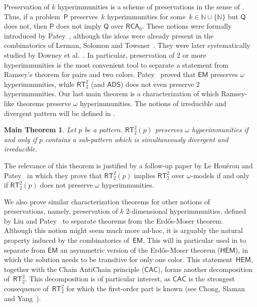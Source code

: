 \documentclass{article}
\newcommand{\Psf}{\mathsf{P}}
\newcommand{\Qsf}{\mathsf{Q}}
\newcommand{\RCA}[0]{\mathsf{RCA}}
\newcommand{\CAC}[0]{\mathsf{CAC}}
\newcommand{\ADS}[0]{\mathsf{ADS}}
\newcommand{\EM}[0]{\mathsf{EM}}
\newcommand{\RT}[0]{\mathsf{RT}}
\newcommand{\NN}[0]{\mathbb{N}}
\def\NN{\mathbb{N}}
\newcommand{\HEM}{\mathsf{HEM}}
\numberwithin{theorem}{section}
\newtheorem{maintheorem}[theorem]{Main Theorem}
\theoremstyle{definition}
\begin{document}
Preservation of $k$ hyperimmunities is a scheme of preservations in the sense of . Thus, if a problem~$\Psf$ preserves~$k$ hyperimmunities for some~$k \in \NN \cup \{\NN\}$ but $\Qsf$ does not, then $\Psf$ does not imply $\Qsf$ over $\RCA_0$. These notions were formally introduced by Patey~\cite{patey2017iterative}, although the ideas were already present in the combinatorics of Lerman, Solomon and Towsner~\cite{lerman2013separating}. They were later systematically studied by Downey et al.~\cite{downey2022relationships}. In particular, preservation of 2 or more hyperimmunities is the most convenient tool to separate a statement from Ramsey's theorem for pairs and two colors. Patey~\cite{patey2017iterative} proved that $\EM$ preserves $\omega$ hyperimmunities, while $\RT^2_2$ (and $\ADS$) does not even preserve 2 hyperimmunities. Our last main theorem is a characterization of which Ramsey-like theorems preserve $\omega$ hyperim\-munities. The notions of irreducible and divergent pattern will be defined in .

\begin{maintheorem}\label{omega-hyp-divergent-irreducible}
Let $p$ be a pattern. $\RT^2_2(p)$ preserves $\omega$ hyperimmunities if and only if $p$ contains a sub-pattern which is simultaneously divergent and irreducible.
\end{maintheorem}

The relevance of this theorem is justified by a follow-up paper by Le Houérou and Patey~\cite{houerou2025ramseylike} in which they prove that $\RT^2_2(p)$ implies $\RT^2_2$ over $\omega$-models if and only if $\RT^2_2(p)$ does not preserve $\omega$ hyperimmunities.

We also prove similar characterization theorems for other notions of preserva\-tions, namely, preservation of $k$ 2-dimensional hyperimmunities, defined by Liu and Patey~\cite{liu2022reverse} to separate theorems from the Erd\H{o}s-Moser theorem. Although this notion might seem much more ad-hoc, it is arguably the natural property induced by the combinatorics of~$\EM$. This will in particular used in  to separate from $\EM$ an asymmetric version of the Erd\H{o}s-Moser theorem ($\HEM$), in which the solution needs to be transitive for only one color. This statement~$\HEM$, together with the Chain AntiChain principle ($\CAC$), forms another decomposition of~$\RT^2_2$. This decomposition is of particular interest, as $\CAC$ is the strongest consequence of~$\RT^2_2$ for which the first-order part is known (see Chong, Slaman and Yang~\cite{chong2021pi11}).
\end{document}

